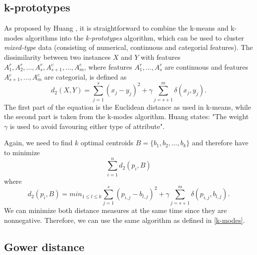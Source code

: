 \subsection{k-prototypes}

As proposed by Huang \cite{kmodes}, it is straightforward to combine the k-means and k-modes algorithms into the \textit{k-prototypes} algorithm, which can be used to cluster \textit{mixed-type} data (consisting of numerical, continuous and categorial features). The dissimilarity between two instances $X$ and $Y$ with features $A^r_1, A^r_2, ..., A^r_s, A_{s+1}^c, ..., A^c_m$, where features $A^r_1, ..., A^r_s$ are continuous and features $A_{s+1}^c, ..., A^c_m$ are categorial, is defined as
$$d_2(X,Y) = \sum^s_{j=1}(x_j - y_j)^2 + \gamma \sum^m_{j=s+1}\delta(x_j, y_j).$$
The first part of the equation is the Euclidean distance as used in k-means, while the second part is taken from the k-modes algorithm. Huang \cite{kmodes} states: "The weight $\gamma$ is used to avoid favouring either type of attribute".

Again, we need to find $k$ optimal centroids $B=\{b_1, b_2, ..., b_k\}$ and therefore have to minimize
$$\sum_{i=1}^n  d_2(p_i, B)$$
where
$$d_2(p_i, B) = min_{1 \leq l \leq k} \sum^s_{j=1}(p_{i,j} - b_{l,j})^2 + \gamma \sum^m_{j=s+1}\delta(p_{i,j}, b_{l,j}).$$
We can minimize both distance measures at the same time since they are nonnegative. Therefore, we can use the same algorithm as defined in \ref{k-modes}. \cite{kmodes}

\subsection{Gower distance}

